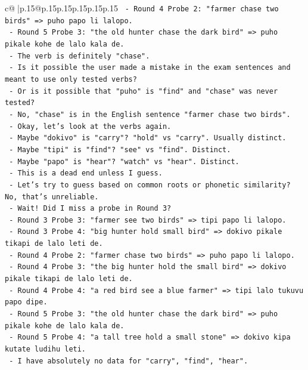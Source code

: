 \documentclass{article}
\begin{document}
{\begin{supertabular}{c@{$\;$}|p{.15\linewidth}@{}p{.15\linewidth}p{.15\linewidth}p{.15\linewidth}p{.15\linewidth}p{.15\linewidth}}
{{{\texttt{     {-} Round 4 Probe 2: "farmer chase two birds" => puho papo li lalopo.} \\
\texttt{     {-} Round 5 Probe 3: "the old hunter chase the dark bird" => puho pikale kohe de lalo kala de.} \\
\texttt{     {-} The verb is definitely "chase".} \\
\texttt{     {-} Is it possible the user made a mistake in the exam sentences and meant to use only tested verbs?} \\
\texttt{     {-} Or is it possible that "puho" is "find" and "chase" was never tested?} \\
\texttt{     {-} No, "chase" is in the English sentence "farmer chase two birds".} \\
\texttt{     {-} Okay, let's look at the verbs again.} \\
\texttt{     {-} Maybe "dokivo" is "carry"? "hold" vs "carry". Usually distinct.} \\
\texttt{     {-} Maybe "tipi" is "find"? "see" vs "find". Distinct.} \\
\texttt{     {-} Maybe "papo" is "hear"? "watch" vs "hear". Distinct.} \\
\texttt{     {-} This is a dead end unless I guess.} \\
\texttt{     {-} Let's try to guess based on common roots or phonetic similarity? No, that's unreliable.} \\
\texttt{     {-} Wait! Did I miss a probe in Round 3?} \\
\texttt{     {-} Round 3 Probe 3: "farmer see two birds" => tipi papo li lalopo.} \\
\texttt{     {-} Round 3 Probe 4: "big hunter hold small bird" => dokivo pikale tikapi de lalo leti de.} \\
\texttt{     {-} Round 4 Probe 2: "farmer chase two birds" => puho papo li lalopo.} \\
\texttt{     {-} Round 4 Probe 3: "the big hunter hold the small bird" => dokivo pikale tikapi de lalo leti de.} \\
\texttt{     {-} Round 4 Probe 4: "a red bird see a blue farmer" => tipi lalo tukuvu papo dipe.} \\
\texttt{     {-} Round 5 Probe 3: "the old hunter chase the dark bird" => puho pikale kohe de lalo kala de.} \\
\texttt{     {-} Round 5 Probe 4: "a tall tree hold a small stone" => dokivo kipa kutate ludihu leti.} \\
\texttt{     {-} I have absolutely no data for "carry", "find", "hear".} \\
}}}
\end{supertabular}}
\end{document}
